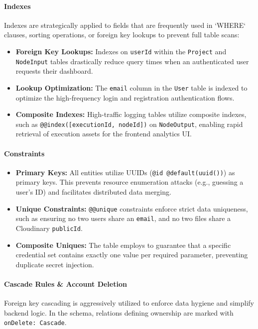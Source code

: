 \paragraph{Indexes}
Indexes are strategically applied to fields that are frequently used in `WHERE` clauses, sorting operations, or foreign key lookups to prevent full table scans:
\begin{itemize}
    \item \textbf{Foreign Key Lookups:} Indexes on \texttt{userId} within the \texttt{Project} and \texttt{NodeInput} tables drastically reduce query times when an authenticated user requests their dashboard.
    \item \textbf{Lookup Optimization:} The \texttt{email} column in the \texttt{User} table is indexed to optimize the high-frequency login and registration authentication flows.
    \item \textbf{Composite Indexes:} High-traffic logging tables utilize composite indexes, such as \texttt{@@index([executionId, nodeId])} on \texttt{NodeOutput}, enabling rapid retrieval of execution assets for the frontend analytics UI.
\end{itemize}

\paragraph{Constraints}
\begin{itemize}
    \item \textbf{Primary Keys:} All entities utilize UUIDs (\texttt{@id @default(uuid())}) as primary keys. This prevents resource enumeration attacks (e.g., guessing a user's ID) and facilitates distributed data merging.
    \item \textbf{Unique Constraints:} \texttt{@@unique} constraints enforce strict data uniqueness, such as ensuring no two users share an \texttt{email}, and no two files share a Cloudinary \texttt{publicId}.
    \item \textbf{Composite Uniques:} The \texttt{} table employs \texttt{} to guarantee that a specific credential set contains exactly one value per required parameter, preventing duplicate secret injection.
\end{itemize}

\paragraph{Cascade Rules \& Account Deletion}
Foreign key cascading is aggressively utilized to enforce data hygiene and simplify backend logic. In the schema, relations defining ownership are marked with \texttt{onDelete: Cascade}. 

